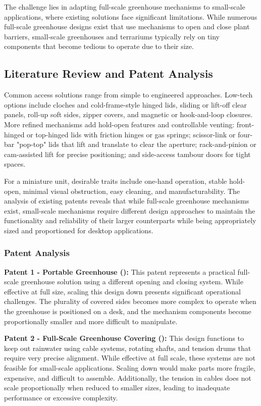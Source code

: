 \documentclass[12pt]{article}
\begin{document}
The challenge lies in adapting full-scale greenhouse mechanisms to small-scale applications, where existing solutions face significant limitations. While numerous full-scale greenhouse designs exist that use mechanisms to open and close plant barriers, small-scale greenhouses and terrariums typically rely on tiny components that become tedious to operate due to their size.

\subsection{Literature Review and Patent Analysis}
\label{sec:literature_review}

Common access solutions range from simple to engineered approaches. Low-tech options include cloches and cold-frame-style hinged lids, sliding or lift-off clear panels, roll-up soft sides, zipper covers, and magnetic or hook-and-loop closures. More refined mechanisms add hold-open features and controllable venting: front-hinged or top-hinged lids with friction hinges or gas springs; scissor-link or four-bar "pop-top" lids that lift and translate to clear the aperture; rack-and-pinion or cam-assisted lift for precise positioning; and side-access tambour doors for tight spaces.

For a miniature unit, desirable traits include one-hand operation, stable hold-open, minimal visual obstruction, easy cleaning, and manufacturability. The analysis of existing patents reveals that while full-scale greenhouse mechanisms exist, small-scale mechanisms require different design approaches to maintain the functionality and reliability of their larger counterparts while being appropriately sized and proportioned for desktop applications.

\subsubsection{Patent Analysis}
\label{sec:patent_analysis}

\textbf{Patent 1 - Portable Greenhouse (\cite{Koziol1974}):} This patent represents a practical full-scale greenhouse solution using a different opening and closing system. While effective at full size, scaling this design down presents significant operational challenges. The plurality of covered sides becomes more complex to operate when the greenhouse is positioned on a desk, and the mechanism components become proportionally smaller and more difficult to manipulate.

\textbf{Patent 2 - Full-Scale Greenhouse Covering (\cite{Jaderloon1999}):} This design functions to keep out rainwater using cable systems, rotating shafts, and tension drums that require very precise alignment. While effective at full scale, these systems are not feasible for small-scale applications. Scaling down would make parts more fragile, expensive, and difficult to assemble. Additionally, the tension in cables does not scale proportionally when reduced to smaller sizes, leading to inadequate performance or excessive complexity.
\end{document}
